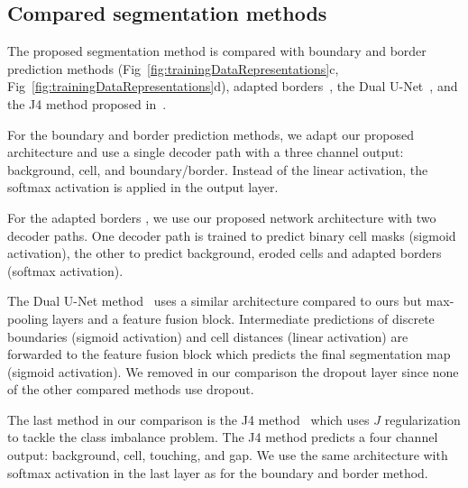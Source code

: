 \documentclass[10pt,letterpaper]{article}
\begin{document}
\subsection*{Compared segmentation methods}
The proposed segmentation method is compared with boundary and border prediction methods (Fig~\ref{fig:trainingDataRepresentations}c, Fig~\ref{fig:trainingDataRepresentations}d), adapted borders~\cite{Scherr2018}, the Dual U-Net~\cite{Li2019}, and the J4 method proposed in~\cite{Pena2019}.

For the boundary and border prediction methods, we adapt our proposed architecture and use a single decoder path with a three channel output: background, cell, and boundary/border. Instead of the linear activation, the softmax activation is applied in the output layer. 

For the adapted borders \cite{Scherr2018}, we use our proposed network architecture with two decoder paths. One decoder path is trained to predict binary cell masks (sigmoid activation), the other to predict background, eroded cells and adapted borders (softmax activation).

The Dual U-Net method~\cite{Li2019} uses a similar architecture compared to ours but max-pooling layers and a feature fusion block. Intermediate predictions of discrete boundaries (sigmoid activation) and cell distances (linear activation) are forwarded to the feature fusion block which predicts the final segmentation map (sigmoid activation). We removed in our comparison the dropout layer since none of the other compared methods use dropout.

The last method in our comparison is the J4 method~\cite{Pena2019} which uses $J$ regularization to tackle the class imbalance problem. The J4 method predicts a four channel output: background, cell, touching, and gap. We use the same architecture with softmax activation in the last layer as for the boundary and border method.
\end{document}
